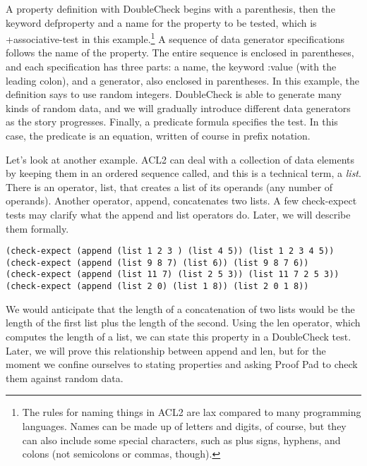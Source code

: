 A property definition with
DoubleCheck begins with a parenthesis, then the keyword
\textsf{defproperty}
and a name for the property to be tested,
which is \textsf{+associative-test} in this example.\footnote{The
rules for naming things in ACL2 are lax compared to many
programming languages. Names can be made up of letters and digits, of course,
but they can also include some special characters,
such as plus signs, hyphens, and colons (not semicolons or commas, though).}
A sequence of data generator specifications follows the name of the property.
The entire sequence is enclosed in parentheses,
and each specification has three parts: a name,
the keyword \textsf{:value} (with the leading colon),
and a generator, also enclosed in parentheses.
In this example, the definition says to use random integers.
DoubleCheck is able to generate many kinds of random data,
and we will gradually introduce different data generators as the story progresses.
Finally, a predicate formula specifies the test.
In this case, the predicate is an equation,
written of course in prefix notation.

Let's look at another example.
ACL2 can deal with a collection of data elements
by keeping them in an ordered sequence
called, and this is a technical term, a
\emph{list}.
There is an operator,
\label{list-op-informal}\textsf{list},
that creates a list of its operands
(any number of operands).
Another operator,
\label{append-op-informal}\textsf{append},
concatenates two lists.
A few \textsf{check-expect} tests may clarify
what the \textsf{append} and \textsf{list} operators do.
Later, we will describe them formally.

\begin{code}
\begin{verbatim}
(check-expect (append (list 1 2 3 ) (list 4 5)) (list 1 2 3 4 5))
(check-expect (append (list 9 8 7) (list 6)) (list 9 8 7 6))
(check-expect (append (list 11 7) (list 2 5 3)) (list 11 7 2 5 3))
(check-expect (append (list 2 0) (list 1 8)) (list 2 0 1 8))
\end{verbatim}	
\end{code}

We would anticipate that the length of a concatenation of two lists
would be the length of the first list plus the length of the second.
Using the
\label{len-op-informal}\textsf{len}
operator, which computes the length of a list,
we can state this property in a DoubleCheck test.
Later, we will prove this relationship between \textsf{append} and \textsf{len},
but for the moment we confine ourselves to stating properties
and asking Proof Pad to check them against random data.

